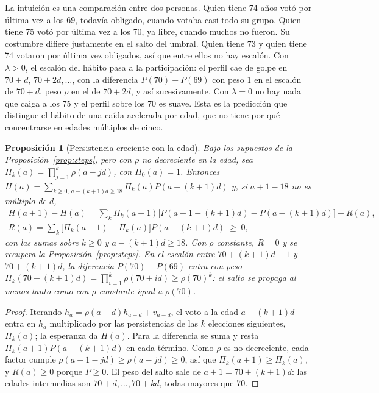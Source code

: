 \documentclass[11pt]{article}
\newtheorem{proposition}{Proposición}
\theoremstyle{definition}
\newcommand{\1}{\mathbbm{1}}
\begin{document}
La intuición es una comparación entre dos personas. Quien tiene 74 años votó por última vez a los
69, todavía obligado, cuando votaba casi todo su grupo. Quien tiene 75 votó por última vez a los 70,
ya libre, cuando muchos no fueron. Su costumbre difiere justamente en el salto del umbral. Quien
tiene 73 y quien tiene 74 votaron por última vez obligados, así que entre ellos no hay escalón.
Con $\lambda>0$, el escalón del hábito pasa a la participación: el perfil cae de golpe en
$70+d,\,70+2d,\dots$, con la diferencia $P(70)-P(69)$ con peso 1 en el escalón de $70+d$, peso $\rho$
en el de $70+2d$, y así sucesivamente. Con $\lambda=0$ no hay nada que caiga a los 75 y el perfil
sobre los 70 es suave. Esta es la predicción que distingue el hábito de una caída acelerada por edad,
que no tiene por qué concentrarse en edades múltiplos de cinco.

\begin{proposition}[Persistencia creciente con la edad]\label{prop:rho}
Bajo los supuestos de la Proposición~\ref{prop:steps}, pero con $\rho$ no decreciente en la edad,
sea $\Pi_k(a)=\prod_{j=1}^{k}\rho(a-jd)$, con $\Pi_0(a)=1$. Entonces
$H(a)=\sum_{k\ge0,\,a-(k+1)d\ge18}\Pi_k(a)P(a-(k+1)d)$ y, si $a+1-18$ no es múltiplo de $d$,
\begin{gather*}
  H(a+1)-H(a)=\sum_{k}\Pi_k(a+1)\bigl[P(a+1-(k+1)d)-P(a-(k+1)d)\bigr]+R(a),\\
  R(a)=\sum_{k}\bigl[\Pi_k(a+1)-\Pi_k(a)\bigr]P(a-(k+1)d)\;\ge\;0,
\end{gather*}
con las sumas sobre $k\ge0$ y $a-(k+1)d\ge18$. Con $\rho$ constante, $R=0$ y se recupera la
Proposición~\ref{prop:steps}. En el escalón entre $70+(k+1)d-1$ y $70+(k+1)d$, la diferencia
$P(70)-P(69)$ entra con peso $\Pi_k(70+(k+1)d)=\prod_{i=1}^{k}\rho(70+id)\ge\rho(70)^{k}$: el salto se
propaga al menos tanto como con $\rho$ constante igual a $\rho(70)$.
\end{proposition}

\begin{proof}
Iterando $h_a=\rho(a-d)h_{a-d}+v_{a-d}$, el voto a la edad $a-(k+1)d$ entra en $h_a$ multiplicado
por las persistencias de las $k$ elecciones siguientes, $\Pi_k(a)$; la esperanza da $H(a)$. Para la
diferencia se suma y resta $\Pi_k(a+1)P(a-(k+1)d)$ en cada término. Como $\rho$ es no decreciente,
cada factor cumple $\rho(a+1-jd)\ge\rho(a-jd)\ge0$, así que $\Pi_k(a+1)\ge\Pi_k(a)$, y $R(a)\ge0$
porque $P\ge0$. El peso del salto sale de $a+1=70+(k+1)d$: las edades intermedias son
$70+d,\dots,70+kd$, todas mayores que 70.
\end{proof}
\end{document}
